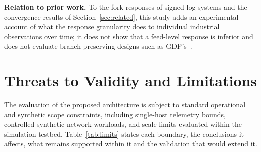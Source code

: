 \textbf{Relation to prior work.} To the fork responses of signed-log systems and the convergence results of Section~\ref{sec:related}, this study adds an experimental account of what the response granularity does to individual industrial observations over time; it does not show that a feed-level response is inferior and does not evaluate branch-preserving designs such as GDP's~\cite{mor2019gdp}.

\section{Threats to Validity and Limitations}\label{sec:limitations}

The evaluation of the proposed architecture is subject to standard operational and synthetic scope constraints, including single-host telemetry bounds, controlled synthetic network workloads, and scale limits evaluated within the simulation testbed. Table~\ref{tab:limits} states each boundary, the conclusions it affects, what remains supported within it and the validation that would extend it.

